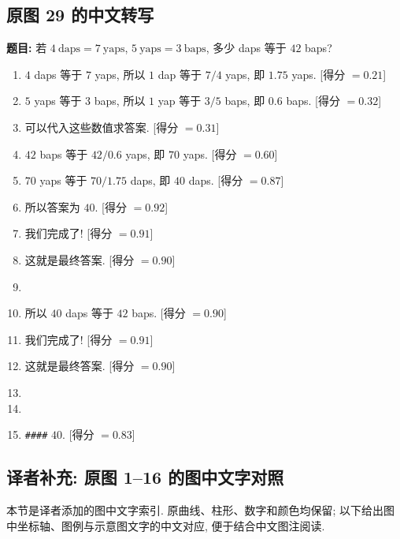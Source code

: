\subsection*{原图 29 的中文转写}
\label{testcompute-image-text:PRM_ex6}
\textbf{题目: }若 $4\ \mathrm{daps}=7\ \mathrm{yaps}$, $5\ \mathrm{yaps}=3\ \mathrm{baps}$, 多少 daps 等于 $42$ baps? 
\begin{enumerate}
\item $4$ daps 等于 $7$ yaps, 所以 $1$ dap 等于 $7/4$ yaps, 即 $1.75$ yaps. [得分 $=0.21$]
\item $5$ yaps 等于 $3$ baps, 所以 $1$ yap 等于 $3/5$ baps, 即 $0.6$ baps. [得分 $=0.32$]
\item 可以代入这些数值求答案. [得分 $=0.31$]
\item $42$ baps 等于 $42/0.6$ yaps, 即 $70$ yaps. [得分 $=0.60$]
\item $70$ yaps 等于 $70/1.75$ daps, 即 $40$ daps. [得分 $=0.87$]
\item 所以答案为 $\boxed{40}$. [得分 $=0.92$]
\item 我们完成了! [得分 $=0.91$]
\item 这就是最终答案. [得分 $=0.90$]
\item {}
\item 所以 $40$ daps 等于 $42$ baps. [得分 $=0.90$]
\item 我们完成了! [得分 $=0.91$]
\item 这就是最终答案. [得分 $=0.90$]
\item {}
\item {}
\item \texttt{\#\#\#\#} $40$. [得分 $=0.83$]
\end{enumerate}

\subsection*{译者补充: 原图 1--16 的图中文字对照}
\label{testcompute-image-text:chart-labels}
本节是译者添加的图中文字索引. 原曲线、柱形、数字和颜色均保留; 以下给出图中坐标轴、图例与示意图文字的中文对应, 便于结合中文图注阅读. 

